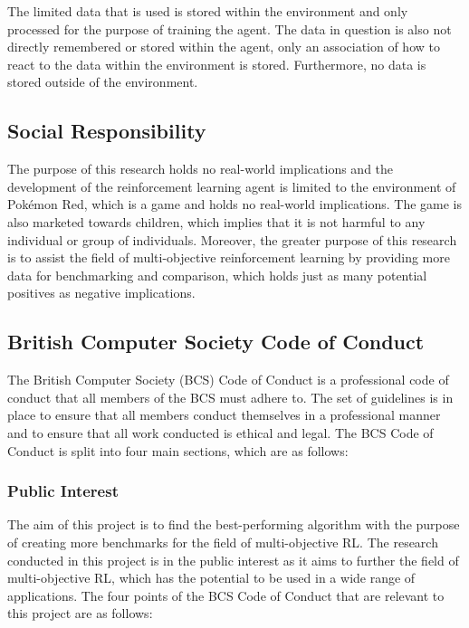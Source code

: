 The limited data that is used is stored within the environment and only processed for the purpose of training the agent. The data in question is also not directly remembered or stored within the agent, only an association of how to react to the data within the environment is stored. Furthermore, no data is stored outside of the environment. 

\subsection{Social Responsibility}

The purpose of this research holds no real-world implications and the development of the reinforcement learning agent is limited to the environment of Pokémon Red, which is a game and holds no real-world implications. The game is also marketed towards children, which implies that it is not harmful to any individual or group of individuals. Moreover, the greater purpose of this research is to assist the field of multi-objective reinforcement learning by providing more data for benchmarking and comparison, which holds just as many potential positives as negative implications.

\subsection{British Computer Society Code of Conduct}

The British Computer Society (BCS) Code of Conduct is a professional code of conduct that all members of the BCS must adhere to. The set of guidelines is in place to ensure that all members conduct themselves in a professional manner and to ensure that all work conducted is ethical and legal. \cite{BSC2022codeofconduct} The BCS Code of Conduct is split into four main sections, which are as follows:

\subsubsection{Public Interest}

The aim of this project is to find the best-performing algorithm with the purpose of creating more benchmarks for the field of multi-objective RL. The research conducted in this project is in the public interest as it aims to further the field of multi-objective RL, which has the potential to be used in a wide range of applications. The four points of the BCS Code of Conduct that are relevant to this project are as follows:

